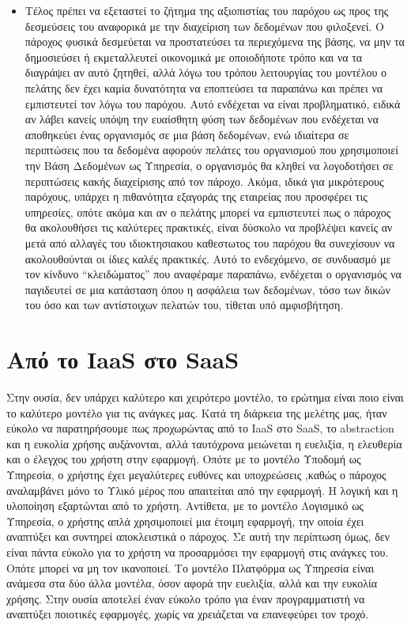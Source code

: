 \documentclass{article}
\begin{document}
\begin{itemize}
\item Τέλος πρέπει να εξεταστεί το ζήτημα της αξιοπιστίας του παρόχου ως προς της δεσμεύσεις του αναφορικά με την διαχείριση των δεδομένων που φιλοξενεί. Ο πάροχος φυσικά δεσμεύεται να προστατεύσει τα περιεχόμενα της βάσης, να μην τα δημοσιεύσει ή εκμεταλλευτεί οικονομικά με οποιοδήποτε τρόπο και να τα διαγράψει αν αυτό ζητηθεί, αλλά λόγω του τρόπου λειτουργίας του μοντέλου ο πελάτης δεν έχει καμία δυνατότητα να εποπτεύσει τα παραπάνω και πρέπει να εμπιστευτεί τον λόγω του παρόχου. Αυτό ενδέχεται να είναι προβληματικό, ειδικά αν λάβει κανείς υπόψη την ευαίσθητη φύση των δεδομένων που ενδέχεται να αποθηκεύει ένας οργανισμός σε μια βάση δεδομένων, ενώ ιδιαίτερα σε περιπτώσεις που τα δεδομένα αφορούν πελάτες του οργανισμού που χρησιμοποιεί την Βάση Δεδομένων ως Υπηρεσία, ο οργανισμός θα κληθεί να λογοδοτήσει σε περιπτώσεις κακής διαχείρισης από τον πάροχο. Ακόμα, ιδικά για μικρότερους παρόχους, υπάρχει η πιθανότητα εξαγοράς της εταιρείας που προσφέρει τις υπηρεσίες, οπότε ακόμα και αν ο πελάτης μπορεί να εμπιστευτεί πως ο πάροχος θα ακολουθήσει τις καλύτερες πρακτικές, είναι δύσκολο να προβλέψει κανείς αν μετά από αλλαγές του ιδιοκτησιακου καθεστωτος του παρόχου θα συνεχίσουν να ακολουθούνται οι ίδιες καλές πρακτικές. Αυτό το ενδεχόμενο, σε συνδυασμό με τον κίνδυνο “κλειδώματος” που αναφέραμε παραπάνω, ενδέχεται ο οργανισμός να παγιδευτεί σε μια κατάσταση όπου η ασφάλεια των δεδομένων, τόσο των δικών του όσο και των αντίστοιχων πελατών του, τίθεται υπό αμφισβήτηση.
\end{itemize}

\section{Από το IaaS στο SaaS}
Στην ουσία, δεν υπάρχει καλύτερο και χειρότερο μοντέλο, το ερώτημα είναι ποιο είναι το καλύτερο μοντέλο για τις ανάγκες μας. Κατά τη διάρκεια της μελέτης μας, ήταν εύκολο να παρατηρήσουμε πως προχωρώντας από το IaaS στο SaaS, το abstraction και η ευκολία χρήσης αυξάνονται, αλλά ταυτόχρονα μειώνεται η ευελιξία, η ελευθερία και ο έλεγχος του χρήστη στην εφαρμογή. Οπότε με το μοντέλο Υποδομή ως Υπηρεσία, ο χρήστης έχει μεγαλύτερες ευθύνες και υποχρεώσεις ,καθώς ο πάροχος αναλαμβάνει μόνο το Υλικό μέρος που απαιτείται από την εφαρμογή. Η λογική και η υλοποίηση εξαρτώνται από το χρήστη. Αντίθετα, με το μοντέλο Λογισμικό ως Υπηρεσία, ο χρήστης απλά χρησιμοποιεί μια έτοιμη εφαρμογή, την οποία έχει αναπτύξει και συντηρεί αποκλειστικά ο πάροχος. Σε αυτή την περίπτωση όμως, δεν είναι πάντα εύκολο για το χρήστη να προσαρμόσει την εφαρμογή στις ανάγκες του. Οπότε μπορεί να μη τον ικανοποιεί. Το μοντέλο Πλατφόρμα ως Υπηρεσία είναι ανάμεσα στα δύο άλλα μοντέλα, όσον αφορά την ευελιξία, αλλά και την ευκολία χρήσης. Στην ουσία αποτελεί έναν εύκολο τρόπο για έναν προγραμματιστή να αναπτύξει ποιοτικές εφαρμογές, χωρίς να χρειάζεται να επανεφεύρει τον τροχό.
\end{document}
